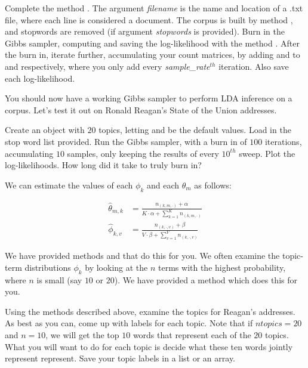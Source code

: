 \begin{problem}
Complete the method . The argument \emph{filename} is the name and location of a .txt file, where each line is considered a document. The corpus is built by method , and stopwords are removed (if argument \emph{stopwords} is provided). Burn in the Gibbs sampler, computing and saving the log-likelihood with the method . After the burn in, iterate further, accumulating your count matrices, by adding  and  to  and  respectively, where you only add every \emph{sample\_rate}$^{th}$ iteration. Also save each log-likelihood.
\end{problem}

You should now have a working Gibbs sampler to perform LDA inference on a corpus. Let's test it out on Ronald Reagan's State of the Union addresses.

\begin{problem}
Create an  object with $20$ topics, letting  and  be the default values. Load in the stop word list provided. Run the Gibbs sampler, with a burn in of $100$ iterations, accumulating $10$ samples, only keeping the results of every $10^{th}$ sweep. Plot the log-likelihoods. How long did it take to truly burn in?
\end{problem}

We can estimate the values of each $\phi_{k}$ and each $\theta_{m}$ as follows:

\begin{align*}
\widehat{\theta}_{m,k} & = \frac{n_{(k,m,\cdot)} + \alpha}{K \cdot \alpha + \sum_{k=1}^{K} n_{(k,m,\cdot)}} \\
\widehat{\phi}_{k,v} & = \frac{n_{(k,\cdot,v)} + \beta}{V \cdot \beta + \sum_{v=1}^{V} n_{(k,\cdot,v)}}
\end{align*}

We have provided methods  and  that do this for you. We often examine the topic-term distributions $\phi_{k}$ by looking at the $n$ terms with the highest probability, where $n$ is small (say $10$ or $20$).  We have provided a method  which does this for you.

\begin{problem}
Using the methods described above, examine the topics for Reagan's addresses. As best as you can, come up with labels for each topic.  Note that if $ntopics=20$ and $n=10$, we will get the top $10$ words that represent each of the $20$ topics.  What you will want to do for each topic is decide what these ten words jointly represent represent.  Save your topic labels in a list or an array.
\end{problem}

